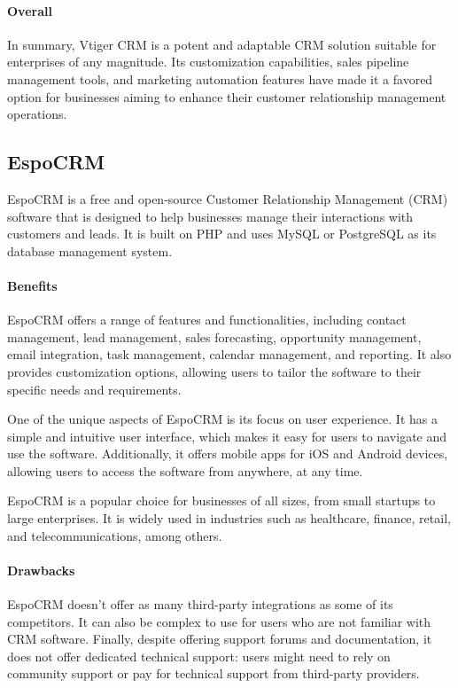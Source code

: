 \documentclass{article}
\begin{document}
\paragraph{Overall}

In summary, Vtiger CRM is a potent and adaptable CRM solution suitable for enterprises of any magnitude. Its customization capabilities, sales pipeline management tools, and marketing automation features have made it a favored option for businesses aiming to enhance their customer relationship management operations.

\subsection{EspoCRM}

EspoCRM is a free and open-source Customer Relationship Management (CRM) software that is designed to help businesses manage their interactions with customers and leads. It is built on PHP and uses MySQL or PostgreSQL as its database management system.

\paragraph{Benefits}

EspoCRM offers a range of features and functionalities, including contact management, lead management, sales forecasting, opportunity management, email integration, task management, calendar management, and reporting. It also provides customization options, allowing users to tailor the software to their specific needs and requirements.

One of the unique aspects of EspoCRM is its focus on user experience. It has a simple and intuitive user interface, which makes it easy for users to navigate and use the software. Additionally, it offers mobile apps for iOS and Android devices, allowing users to access the software from anywhere, at any time.

EspoCRM is a popular choice for businesses of all sizes, from small startups to large enterprises. It is widely used in industries such as healthcare, finance, retail, and telecommunications, among others.

\paragraph{Drawbacks}

EspoCRM doesn't offer as many third-party integrations as some of its competitors. It can also be complex to use for users who are not familiar with CRM software. Finally, despite offering support forums and documentation, it does not offer dedicated technical support: users might need to rely on community support or pay for technical support from third-party providers.
\end{document}
